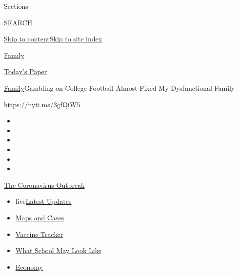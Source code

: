 Sections

SEARCH

\protect\hyperlink{site-content}{Skip to
content}\protect\hyperlink{site-index}{Skip to site index}

\href{https://www.nytimes.com/section/well/family}{Family}

\href{https://myaccount.nytimes.com/auth/login?response_type=cookie\&client_id=vi}{}

\href{https://www.nytimes.com/section/todayspaper}{Today's Paper}

\href{/section/well/family}{Family}\textbar{}Gambling on College
Football Almost Fixed My Dysfunctional Family

\url{https://nyti.ms/3gfQiW5}

\begin{itemize}
\item
\item
\item
\item
\item
\item
\end{itemize}

\href{https://www.nytimes.com/news-event/coronavirus?action=click\&pgtype=Article\&state=default\&region=TOP_BANNER\&context=storylines_menu}{The
Coronavirus Outbreak}

\begin{itemize}
\tightlist
\item
  live\href{https://www.nytimes.com/2020/08/01/world/coronavirus-covid-19.html?action=click\&pgtype=Article\&state=default\&region=TOP_BANNER\&context=storylines_menu}{Latest
  Updates}
\item
  \href{https://www.nytimes.com/interactive/2020/us/coronavirus-us-cases.html?action=click\&pgtype=Article\&state=default\&region=TOP_BANNER\&context=storylines_menu}{Maps
  and Cases}
\item
  \href{https://www.nytimes.com/interactive/2020/science/coronavirus-vaccine-tracker.html?action=click\&pgtype=Article\&state=default\&region=TOP_BANNER\&context=storylines_menu}{Vaccine
  Tracker}
\item
  \href{https://www.nytimes.com/interactive/2020/07/29/us/schools-reopening-coronavirus.html?action=click\&pgtype=Article\&state=default\&region=TOP_BANNER\&context=storylines_menu}{What
  School May Look Like}
\item
  \href{https://www.nytimes.com/live/2020/07/31/business/stock-market-today-coronavirus?action=click\&pgtype=Article\&state=default\&region=TOP_BANNER\&context=storylines_menu}{Economy}
\end{itemize}

